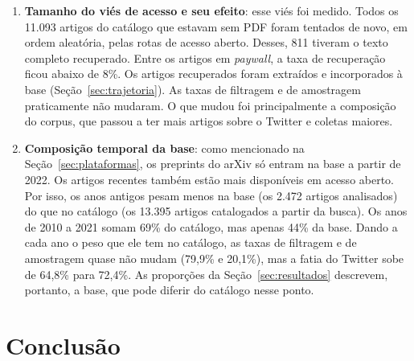 \documentclass[11pt,a4paper]{article}
\begin{document}
\begin{enumerate}[leftmargin=1.4em]
{  anti-automação de 3 KB no endereço do PDF, enquanto a página de destino
  continua respondendo normalmente; a IEEE devolve HTTP 202 com corpo vazio.
  Verificado em quatro DOIs de periódico e de capítulo, de 2015 a 2022, com a
  mesma resposta.} A barreira, portanto, é a política das editoras em relação
  ao acesso automatizado, e não a assinatura. Por isso, a caracterização
  descreve a literatura disponível em acesso aberto.
  \item \textbf{Tamanho do viés de acesso e seu efeito}: esse viés foi medido.
  Todos os 11.093 artigos do catálogo que estavam sem PDF foram tentados de novo, em ordem aleatória, pelas rotas de acesso aberto. Desses, 811 tiveram o texto completo recuperado. Entre os artigos em \textit{paywall}, a taxa de
  recuperação ficou abaixo de 8\%. Os artigos recuperados foram extraídos e
  incorporados à base (Seção~\ref{sec:trajetoria}). As taxas de filtragem e de
  amostragem praticamente não mudaram. O que mudou foi principalmente a composição do corpus,
  que passou a ter mais artigos sobre o Twitter e coletas maiores.
  \item \textbf{Composição temporal da base}: como mencionado na
  Seção~\ref{sec:plataformas}, os preprints do arXiv só entram na base a partir de 2022. Os artigos recentes também estão mais disponíveis em acesso aberto.
  Por isso, os anos antigos pesam menos na base (os 2.472 artigos analisados) do
  que no catálogo (os 13.395 artigos catalogados a partir da busca). Os anos de
  2010 a 2021 somam 69\% do catálogo, mas apenas 44\% da base. Dando a cada ano
  o peso que ele tem no catálogo, as taxas de filtragem e de amostragem quase não
  mudam (79,9\% e 20,1\%), mas a fatia do Twitter sobe de 64,8\% para 72,4\%. As
  proporções da Seção~\ref{sec:resultados} descrevem, portanto, a base, que
  pode diferir do catálogo nesse ponto.
\end{enumerate}

\section{Conclusão}
\label{sec:conclusao}
\end{document}
